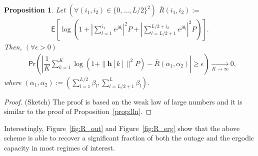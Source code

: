 \documentclass[10pt,journal,a4paper]{IEEEtran}
\newcommand{\eqdef}{:=}
\newcommand{\E}{\mathsf{E}}		%
\renewcommand{\P}{\mathsf{Pr}} 			%
\renewcommand{\vec}[1]{\bm{#1}}		%
\newtheorem{proposition}{Proposition}
\begin{document}
\begin{proposition}
Let $(\forall (i_1,i_2) \in \{0,\ldots,L/2\}^2)$ $\bar{R}(i_1,i_2)\eqdef $
\begin{equation*}
\begin{split}
\E\left[\log\left(1+\left| \textstyle \sum_{l=1}^{i_1}e^{j\theta_l}\right|^2P+\left| \textstyle \sum_{l=L/2+1}^{L/2+i_2}e^{j\theta_l}\right|^2P\right)\right].
\end{split}
\end{equation*}
Then, $(\forall \epsilon > 0)$
\begin{align*}
&\P\left(\left|\dfrac{1}{K}\sum_{k=1}^{K}\log(1+\|\vec{h}[k]\|^2P)-\bar{R}(\alpha_1,\alpha_2) \right|\geq \epsilon\right)\underset{K\to \infty}{\to} 0,
\end{align*}
where  $(\alpha_1,\alpha_2) \eqdef \left(\sum_{l=1}^{L/2}\beta_l,\sum_{l=L/2+1}^{L}\beta_l\right)$.
\end{proposition}
\begin{proof}
(Sketch) The proof is based on the weak law of large numbers and it is similar to the proof of Proposition~\ref{prop:lln}.
\end{proof}
Interestingly, Figure~\ref{fig:R_out} and Figure~\ref{fig:R_erg} show that the above scheme is able to recover a significant fraction of both the outage and the ergodic capacity in most regimes of interest. %
\end{document}
